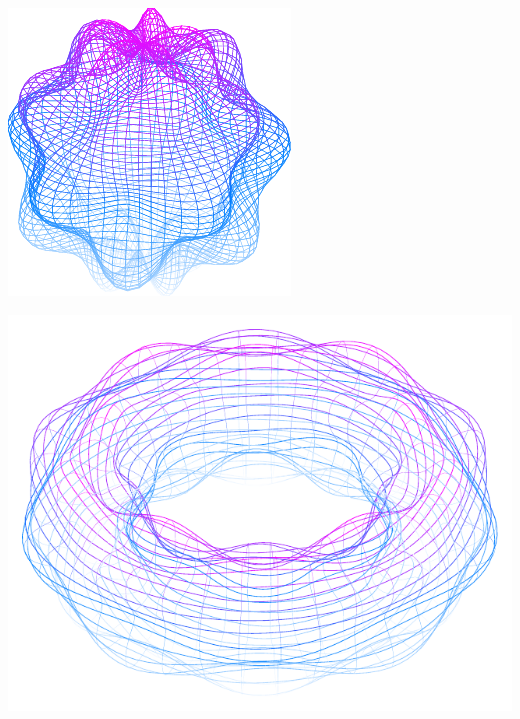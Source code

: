 \documentclass[11pt,openany]{article}
\begin{document}
\begin{center}
\begin{minipage}{.45\textwidth}\centering
	\includegraphics[scale=.9]{../tikz/grad-math-tikz-pdf/sphere2.pdf}
\end{minipage}
\begin{minipage}{.45\textwidth}\centering
	\includegraphics[scale=.5]{../tikz/grad-math-tikz-pdf/torus2.pdf}
\end{minipage}
\end{center}
\vfill
\end{document}
